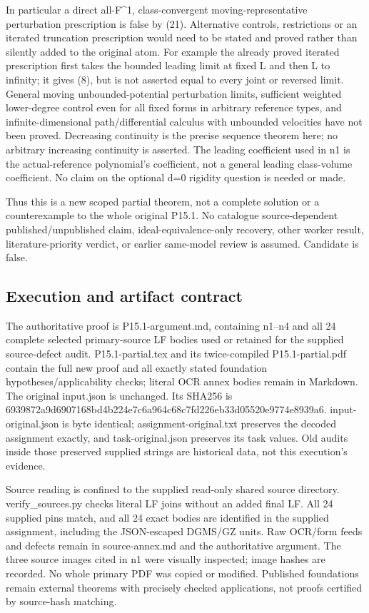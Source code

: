\documentclass[
]{article}
\begin{document}
In particular a direct all-F\^{}1, class-convergent
moving-representative perturbation prescription is false by (21).
Alternative controls, restrictions or an iterated truncation
prescription would need to be stated and proved rather than silently
added to the original atom. For example the already proved iterated
prescription first takes the bounded leading limit at fixed L and then L
to infinity; it gives (8), but is not asserted equal to every joint or
reversed limit. General moving unbounded-potential perturbation limits,
sufficient weighted lower-degree control even for all fixed forms in
arbitrary reference types, and infinite-dimensional path/differential
calculus with unbounded velocities have not been proved. Decreasing
continuity is the precise sequence theorem here; no arbitrary increasing
continuity is asserted. The leading coefficient used in n1 is the
actual-reference polynomial's coefficient, not a general leading
class-volume coefficient. No claim on the optional d=0 rigidity question
is needed or made.

Thus this is a new scoped partial theorem, not a complete solution or a
counterexample to the whole original P15.1. No catalogue
source-dependent published/unpublished claim, ideal-equivalence-only
recovery, other worker result, literature-priority verdict, or earlier
same-model review is assumed. Candidate is false.

\subsection{Execution and artifact
contract}\label{execution-and-artifact-contract}

The authoritative proof is P15.1-argument.md, containing n1--n4 and all
24 complete selected primary-source LF bodies used or retained for the
supplied source-defect audit. P15.1-partial.tex and its twice-compiled
P15.1-partial.pdf contain the full new proof and all exactly stated
foundation hypotheses/applicability checks; literal OCR annex bodies
remain in Markdown. The original input.json is unchanged. Its SHA256 is
6939872a9d6907168bd4b224e7c6a964c68c7fd226eb33d05520e9774e8939a6.
input-original.json is byte identical; assignment-original.txt preserves
the decoded assignment exactly, and task-original.json preserves its
task values. Old audits inside those preserved supplied strings are
historical data, not this execution's evidence.

Source reading is confined to the supplied read-only shared source
directory. verify\_sources.py checks literal LF joins without an added
final LF. All 24 supplied pins match, and all 24 exact bodies are
identified in the supplied assignment, including the JSON-escaped
DGMS/GZ units. Raw OCR/form feeds and defects remain in source-annex.md
and the authoritative argument. The three source images cited in n1 were
visually inspected; image hashes are recorded. No whole primary PDF was
copied or modified. Published foundations remain external theorems with
precisely checked applications, not proofs certified by source-hash
matching.
\end{document}

